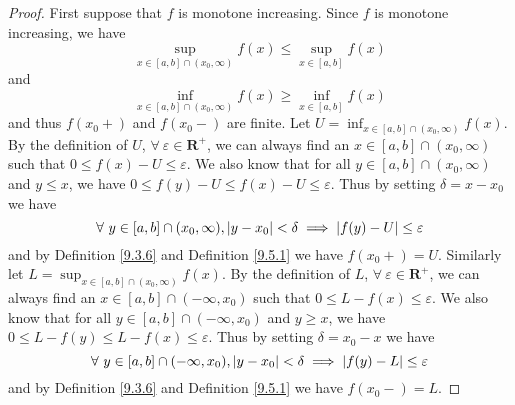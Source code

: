 \begin{proof}
    First suppose that \(f\) is monotone increasing.
    Since \(f\) is monotone increasing, we have
    \[
        \sup_{x \in [a, b] \cap (x_0, \infty)} f(x) \leq \sup_{x \in [a, b]} f(x)
    \]
    and
    \[
        \inf_{x \in [a, b] \cap (x_0, \infty)} f(x) \geq \inf_{x \in [a, b]} f(x)
    \]
    and thus \(f(x_0+)\) and \(f(x_0-)\) are finite.
    Let \(U = \inf_{x \in [a, b] \cap (x_0, \infty)} f(x)\).
    By the definition of \(U\), \(\forall\ \varepsilon \in \mathbf{R}^+\), we can always find an \(x \in [a, b] \cap (x_0, \infty)\) such that \(0 \leq f(x) - U \leq \varepsilon\).
    We also know that for all \(y \in [a, b] \cap (x_0, \infty)\) and \(y \leq x\), we have \(0 \leq f(y) - U \leq f(x) - U \leq \varepsilon\).
    Thus by setting \(\delta = x - x_0\) we have
    \[
        \forall\ y \in [a, b] \cap (x_0, \infty), \abs*{y - x_0} < \delta \implies \abs*{f(y) - U} \leq \varepsilon
    \]
    and by Definition \ref{9.3.6} and Definition \ref{9.5.1} we have \(f(x_0+) = U\).
    Similarly let \(L = \sup_{x \in [a, b] \cap (x_0, \infty)} f(x)\).
    By the definition of \(L\), \(\forall\ \varepsilon \in \mathbf{R}^+\), we can always find an \(x \in [a, b] \cap (-\infty, x_0)\) such that \(0 \leq L - f(x) \leq \varepsilon\).
    We also know that for all \(y \in [a, b] \cap (-\infty, x_0)\) and \(y \geq x\), we have \(0 \leq L - f(y) \leq L - f(x) \leq \varepsilon\).
    Thus by setting \(\delta = x_0 - x\) we have
    \[
        \forall\ y \in [a, b] \cap (-\infty, x_0), \abs*{y - x_0} < \delta \implies \abs*{f(y) - L} \leq \varepsilon
    \]
    and by Definition \ref{9.3.6} and Definition \ref{9.5.1} we have \(f(x_0-) = L\).


\end{proof}
